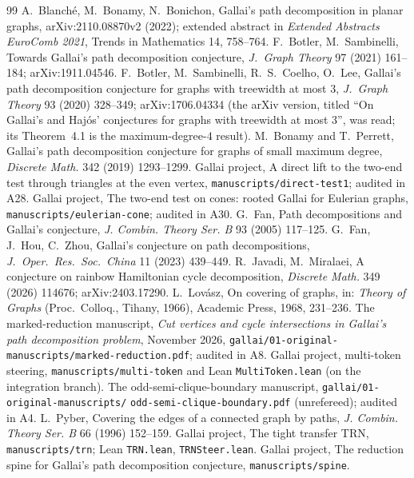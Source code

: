 \documentclass[11pt]{amsart}
\theoremstyle{definition}
\theoremstyle{remark}
\renewcommand{\_}{\oldunderscore\allowbreak}
\begin{document}
\begin{thebibliography}{99}
 A.~Blanch\'e, M.~Bonamy, N.~Bonichon, Gallai's path decomposition in planar graphs,
arXiv:2110.08870v2 (2022); extended abstract in \emph{Extended Abstracts EuroComb 2021}, Trends in
Mathematics 14, 758--764.
 F.~Botler, M.~Sambinelli, Towards Gallai's path decomposition conjecture, \emph{J.\ Graph
Theory} 97 (2021) 161--184; arXiv:1911.04546.
 F.~Botler, M.~Sambinelli, R.~S.~Coelho, O.~Lee, Gallai's path decomposition conjecture
for graphs with treewidth at most 3, \emph{J.\ Graph Theory} 93 (2020) 328--349; arXiv:1706.04334
(the arXiv version, titled ``On Gallai's and Haj\'os' conjectures for graphs with treewidth at most
3'', was read; its Theorem~4.1 is the maximum-degree-$4$ result).
 M.~Bonamy and T.~Perrett, Gallai's path decomposition conjecture for graphs of small
maximum degree, \emph{Discrete Math.} 342 (2019) 1293--1299.
 Gallai project, A direct lift to the two-end test through triangles at the even
vertex, \texttt{manuscripts/direct-test1}; audited in A28.
 Gallai project, The two-end test on cones: rooted Gallai for Eulerian graphs,
\texttt{manuscripts/eulerian-cone}; audited in A30.
 G.~Fan, Path decompositions and Gallai's conjecture, \emph{J. Combin. Theory Ser. B}
93 (2005) 117--125.
 G.~Fan, J.~Hou, C.~Zhou, Gallai's conjecture on path decompositions, \emph{J.\ Oper.\
Res.\ Soc.\ China} 11 (2023) 439--449.
 R.~Javadi, M.~Miralaei, A conjecture on rainbow Hamiltonian cycle decomposition,
\emph{Discrete Math.} 349 (2026) 114676; arXiv:2403.17290.
 L.~Lov\'asz, On covering of graphs, in: \emph{Theory of Graphs} (Proc.\ Colloq., Tihany,
1966), Academic Press, 1968, 231--236.
 The marked-reduction manuscript, \emph{Cut vertices and cycle intersections in Gallai's
path decomposition problem}, November 2026, \texttt{gallai/01-original-manuscripts/marked-reduction.pdf};
audited in A8.
 Gallai project, multi-token steering, \texttt{manuscripts/multi-token} and Lean
\texttt{MultiToken.lean} (on the integration branch).
 The odd-semi-clique-boundary manuscript, \texttt{gallai/01-original-manuscripts/}
\texttt{odd-semi-clique-boundary.pdf} (unrefereed); audited in A4.
\bibitem{Pyb96} L.~Pyber, Covering the edges of a connected graph by paths, \emph{J. Combin. Theory
Ser. B} 66 (1996) 152--159.
 Gallai project, The tight transfer TRN, \texttt{manuscripts/trn}; Lean
\texttt{TRN.lean}, \texttt{TRNSteer.lean}.
 Gallai project, The reduction spine for Gallai's path decomposition conjecture,
\texttt{manuscripts/spine}.
\end{thebibliography}
\end{document}
